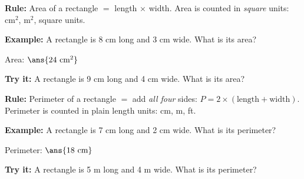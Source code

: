 \documentclass[12pt]{article}
\begin{document}


\begin{formulabox}
\textbf{Rule:} Area of a rectangle $=$ length $\times$ width. Area is counted
in \emph{square} units: cm$^2$, m$^2$, square units.
\end{formulabox}

\begin{examplebox}
\textbf{Example:} A rectangle is 8 cm long and 3 cm wide. What is its area?

Area: $\ans{24\ \text{cm}^2}$
\end{examplebox}

\begin{tryitbox}
\textbf{Try it:} A rectangle is 9 cm long and 4 cm wide. What is its
area?\\[2pt]
\end{tryitbox}


\begin{formulabox}
\textbf{Rule:} Perimeter of a rectangle $=$ add \emph{all four} sides:
$P = 2 \times (\text{length} + \text{width})$. Perimeter is counted in plain
length units: cm, m, ft.
\end{formulabox}

\begin{examplebox}
\textbf{Example:} A rectangle is 7 cm long and 2 cm wide. What is its
perimeter?

Perimeter: $\ans{18\ \text{cm}}$
\end{examplebox}

\begin{tryitbox}
\textbf{Try it:} A rectangle is 5 m long and 4 m wide. What is its
perimeter?\\[2pt]
\end{tryitbox}

\end{document}
